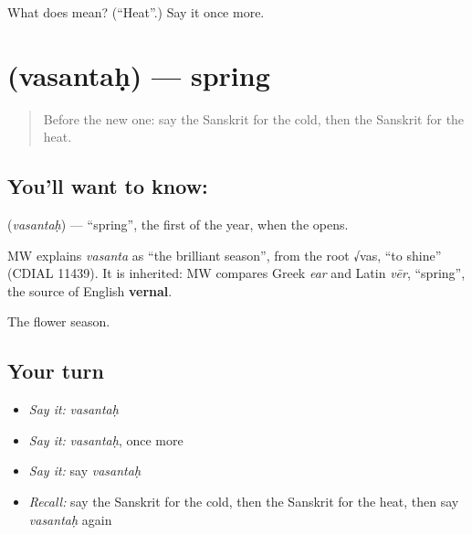 \begin{tcolorbox}[breakable,colback=teal!4,colframe=teal!35!black,title={Before you move on}]
What does  mean? (\textquotedblleft{}Heat\textquotedblright{}.) Say it once more.
\end{tcolorbox}
\section[\texorpdfstring{\sk{वसन्तः} (vasantaḥ)}{वसन्तः (vasantaḥ)}]{ (vasantaḥ) — spring}

\label{lesson:SA-C76-spring}



\begin{quote}
Before the new one: say the Sanskrit for the cold, then the Sanskrit for the heat.
\end{quote}

\subsection*{You'll want to know: }
\textbf{} (\emph{vasantaḥ}) — \textquotedblleft{}spring\textquotedblright{}, the first \textbf{} of the year, when the \textbf{} opens.

\begin{cousinweb}
MW explains \emph{vasanta} as \textquotedblleft{}the brilliant season\textquotedblright{}, from the root √vas, \textquotedblleft{}to shine\textquotedblright{} (CDIAL 11439). It is inherited: MW compares Greek \emph{ear} and Latin \emph{vēr}, \textquotedblleft{}spring\textquotedblright{}, the source of English \textbf{vernal}.
\end{cousinweb}

\begin{grammarlens}[title={What you've built}]
The flower season.
\end{grammarlens}

\subsection*{Your turn}
\begin{itemize}
\raggedright
  \item \emph{Say it:} \emph{vasantaḥ}
  \item \emph{Say it:} \emph{vasantaḥ}, once more
  \item \emph{Say it:} say \emph{vasantaḥ}
  \item \emph{Recall:} say the Sanskrit for the cold, then the Sanskrit for the heat, then say \emph{vasantaḥ} again
\end{itemize}

